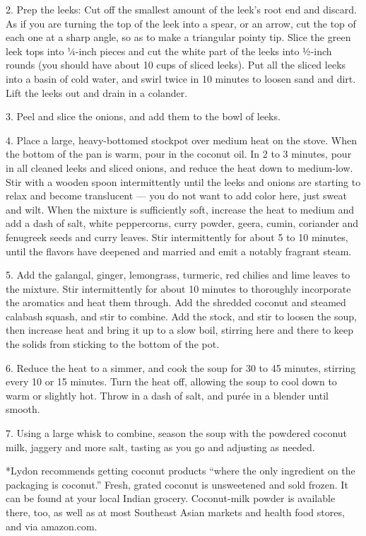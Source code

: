 2. Prep the leeks: Cut off the smallest amount of the leek's root end
and discard. As if you are turning the top of the leek into a spear, or
an arrow, cut the top of each one at a sharp angle, so as to make a
triangular pointy tip. Slice the green leek tops into ¼-inch pieces and
cut the white part of the leeks into ½-inch rounds (you should have
about 10 cups of sliced leeks). Put all the sliced leeks into a basin of
cold water, and swirl twice in 10 minutes to loosen sand and dirt. Lift
the leeks out and drain in a colander.

3. Peel and slice the onions, and add them to the bowl of leeks.

4. Place a large, heavy-bottomed stockpot over medium heat on the stove.
When the bottom of the pan is warm, pour in the coconut oil. In 2 to 3
minutes, pour in all cleaned leeks and sliced onions, and reduce the
heat down to medium-low. Stir with a wooden spoon intermittently until
the leeks and onions are starting to relax and become translucent ---
you do not want to add color here, just sweat and wilt. When the mixture
is sufficiently soft, increase the heat to medium and add a dash of
salt, white peppercorns, curry powder, geera, cumin, coriander and
fenugreek seeds and curry leaves. Stir intermittently for about 5 to 10
minutes, until the flavors have deepened and married and emit a notably
fragrant steam.

5. Add the galangal, ginger, lemongrass, turmeric, red chilies and lime
leaves to the mixture. Stir intermittently for about 10 minutes to
thoroughly incorporate the aromatics and heat them through. Add the
shredded coconut and steamed calabash squash, and stir to combine. Add
the stock, and stir to loosen the soup, then increase heat and bring it
up to a slow boil, stirring here and there to keep the solids from
sticking to the bottom of the pot.

6. Reduce the heat to a simmer, and cook the soup for 30 to 45 minutes,
stirring every 10 or 15 minutes. Turn the heat off, allowing the soup to
cool down to warm or slightly hot. Throw in a dash of salt, and purée in
a blender until smooth.

7. Using a large whisk to combine, season the soup with the powdered
coconut milk, jaggery and more salt, tasting as you go and adjusting as
needed.

*Lydon recommends getting coconut products ``where the only ingredient
on the packaging is coconut.'' Fresh, grated coconut is unsweetened and
sold frozen. It can be found at your local Indian grocery. Coconut-milk
powder is available there, too, as well as at most Southeast Asian
markets and health food stores, and via amazon.com.

